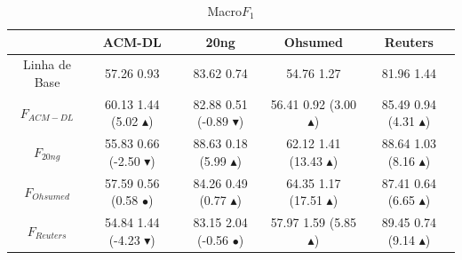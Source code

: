 \documentclass[10pt, red]{beamer}
\newcommand{\triangOK}{\textcolor[rgb]{00,0.45,0.10}{$\blacktriangle$}}
\newcommand{\triangBAD}{\textcolor[rgb]{0.7,00,00}{$\blacktriangledown$}}
\newcommand{\ball}{\textcolor[rgb]{0.7,0.70,0.0}{$\bullet$}}
\begin{document}
{\begin{table}[!h]
\centering
\caption{Macro$F_1$} %
\label{tab::generalizacao-Macro}
\tiny
\begin{adjustwidth}{-0.7cm}{-0.7cm}%
\begin{tabular}{|c|c|c|c|c|}
\toprule
 & \textbf{ACM-DL} & \textbf{20ng} & \textbf{Ohsumed} & \textbf{Reuters}\tabularnewline
\midrule
\hline
Linha de Base & 57.26 \textpm{} 0.93 & 83.62 \textpm{} 0.74 & 54.76 \textpm{} 1.27 & 81.96 \textpm{} 1.44\tabularnewline
\hline 
$F_{ACM-DL}$ & 60.13 \textpm{} 1.44 (5.02 \triangOK) & 82.88 \textpm{} 0.51 (-0.89 \triangBAD) & 56.41 \textpm{}  0.92 (3.00 \triangOK) & 85.49 \textpm{} 0.94 (4.31 \triangOK)\tabularnewline
\hline 
$F_{20ng}$ & 55.83 \textpm{} 0.66 (-2.50 \triangBAD) & 88.63 \textpm{} 0.18 (5.99 \triangOK) & 62.12 \textpm{} 1.41 (13.43 \triangOK) & 88.64 \textpm{} 1.03 (8.16 \triangOK)\tabularnewline
\hline 
$F_{Ohsumed}$ & 57.59 \textpm{} 0.56 (0.58 \ball) & 84.26 \textpm{}  0.49 (0.77 \triangOK) & 64.35 \textpm{} 1.17 (17.51 \triangOK) & 87.41 \textpm{} 0.64 (6.65 \triangOK)\tabularnewline
\hline 
$F_{Reuters}$ & 54.84 \textpm{} 1.44 (-4.23 \triangBAD) & 83.15 \textpm{} 2.04 (-0.56 \ball) & 57.97 \textpm{} 1.59 (5.85 \triangOK) & 89.45 \textpm{}  0.74 (9.14 \triangOK)\tabularnewline
\bottomrule 
\end{tabular}
\end{adjustwidth}
\end{table}

}
\end{document}
